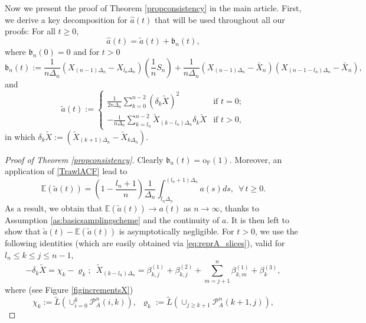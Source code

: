 \documentclass{article}
\theoremstyle{plain}
\theoremstyle{definition}
\theoremstyle{remark}
\begin{document}
\begin{appendix}
Now we present the proof of Theorem  \ref{propconsistency}  in the main article. %
First, we derive a key decomposition for $\hat{a}(t)$ that will be used throughout all our proofs:  For all $t\geq0$, 
\begin{equation}
	\hat{a}(t)=\tilde{a}(t)+\mathfrak{b}_{n}(t),\label{eq:decouplinghata}
\end{equation}
where $\mathfrak{b}_{n}(0)=0$ and for $t>0$
\[
\mathfrak{b}_{n}(t):=\frac{1}{n\Delta_{n}}(X_{(n-1)\Delta_{n}}-X_{l_{n}\Delta_{n}})\left(\frac{1}{n}S_{n}\right)+\frac{1}{n\Delta_{n}}(X_{(n-1)\Delta_{n}}-\bar{X}_{n})(X_{(n-1-l_{n})\Delta_{n}}-\bar{X}_{n}),
\]
and 
\[
\tilde{a}(t):=\begin{cases}
	\frac{1}{2n\Delta_{n}}\sum_{k=0}^{n-2}(\delta_{k}\tilde{X})^{2} & \text{if }t=0;\\
	-\frac{1}{n\Delta_{n}}\sum_{k=l_{n}}^{n-2}\tilde{X}_{(k-l_{n})\Delta_{n}}\delta_{k}\tilde{X} & \text{if }t>0,
\end{cases}
\]
in which $\delta_{k}\tilde{X}:=\left(\tilde{X}_{(k+1)\Delta_{n}}-\tilde{X}_{k\Delta_{n}}\right)$.
\begin{proof}[Proof of Theorem  \ref{propconsistency}]
	Clearly $\mathfrak{b}_{n}(t)=\mathrm{o}_\mathbb{P}(1)$. Moreover, an application of \eqref{TrawlACF} lead to 
	\begin{equation}\label{expatilde}
		\mathbb{E}(\tilde{a}(t))=(1-\frac{l_n+1}{n})\frac{1}{\Delta_{n}}\int_{l_{n}\Delta_{n}}^{(l_{n}+1)\Delta_{n}}a(s)ds, \,\,\, \forall \,t\geq0.
	\end{equation}
	As a result, we obtain that $\mathbb{E}(\tilde{a}(t))\rightarrow a(t)$  as $n\rightarrow\infty$, thanks to Assumption \ref{as:basicsamplingscheme} and the continuity of $a$.  It is then left to show that $\tilde{a}(t)-\mathbb{E}(\tilde{a}(t))$ is asymptotically negligible. For $t>0$, we use the following identities (which are easily obtained via \eqref{eq:reprA_slices}), valid for $l_{n}\leq k\leq j\leq n-1$,
	\begin{equation}
		-\delta_{k}\tilde{X}=  \chi_{k}-\varrho_{k}; \,\,\, \tilde{X}_{(k-l_{n})\Delta_{n}}=  \beta_{k,j}^{(1)}+\beta_{k,j}^{(2)}+\sum_{m=j+1}^{n}\beta_{k,m}^{(1)}+\beta_{k}^{(3)},\label{decXbetas}
	\end{equation}
	where (see Figure \ref{figincrementsX})
	\begin{equation}
		\chi_{k}:=\tilde{L}(\cup_{i=0}^{k}\mathcal{P}_{A}^{n}(i,k)),\,\,\,\varrho_{k}:=\tilde{L}(\cup_{j\geq k+1}\mathcal{P}_{A}^{n}(k+1,j)),\label{defchirho}
	\end{equation}

\end{proof}
\end{appendix}
\end{document}
